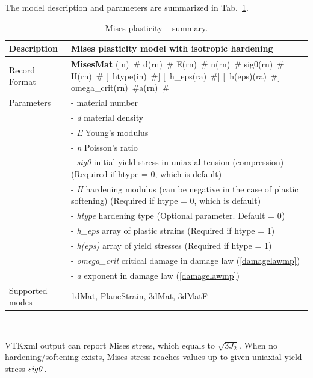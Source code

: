 \documentclass[a4paper]{article}
\newcommand{\descitem}[1]{{\noindent \bf #1}}
\newcommand{\elemparam}[2]{{{#1\tiny (#2)}~\#}}
\newcommand{\optelemparam}[2]{[{~\elemparam{#1}{#2}}]}
\newcommand{\param}[1]{{\it #1}}
\newenvironment{mmt}{\begin{tabular}{|l|p{9cm}|}}{\end{tabular}\\}
\newenvironment{mmt}{\begin{tabular}{|l|l|}}{\end{tabular}\\}
\begin{document}
The model description and parameters are summarized in Tab.~\ref{misesMat_table}.
\begin{table}[!htb]
\begin{mmt}
\hline
Description & Mises plasticity model with isotropic hardening\\
\hline
Record Format & \descitem{MisesMat}  \elemparam{}{in}
\elemparam{d}{rn} \elemparam{E}{rn} \elemparam{n}{rn} \elemparam{sig0}{rn} \elemparam{H}{rn} \optelemparam{htype}{in} \optelemparam{h\_eps}{ra} \optelemparam{h(eps)}{ra} \elemparam{omega\_crit}{rn}\elemparam{a}{rn}\\
Parameters &- \param{} material number\\
&- \param{d} material density\\
&- \param{E} Young's modulus\\
&- \param{n} Poisson's ratio\\
&- \param{sig0} initial yield stress in uniaxial tension (compression) (Required if htype = 0, which is default)\\
&- \param{H} hardening modulus (can be negative in the case of plastic softening) (Required if htype = 0, which is default)\\
&- \param{htype} hardening type (Optional parameter. Default = 0)\\
&- \param{h\_eps} array of plastic strains (Required if htype = 1)\\
&- \param{h(eps)} array of yield stresses (Required if htype = 1)\\
&- \param{omega\_crit} critical damage in damage law (\ref{damagelawmp})\\
&- \param{a} exponent in damage law (\ref{damagelawmp})\\
Supported modes& 1dMat, PlaneStrain, 3dMat, 3dMatF\\
\hline
\end{mmt}
\caption{Mises plasticity -- summary.}
\label{misesMat_table}
\end{table}

VTKxml output can report Mises stress, which equals to $\sqrt{3J_2}$. When no hardening/softening exists, Mises stress reaches values up to given uniaxial yield stress $\param{sig0}$. 
\end{document}
